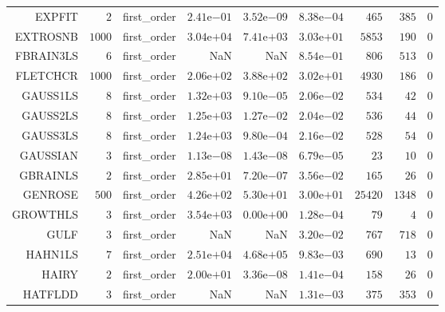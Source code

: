 \begin{longtable}{rrrrrrrrr}
EXPFIT & \(     2\) & first\_order & \( 2.41\)e\(-01\) & \( 3.52\)e\(-09\) & \( 8.38\)e\(-04\) & \(   465\) & \(   385\) & \(     0\) \\
EXTROSNB & \(  1000\) & first\_order & \( 3.04\)e\(+04\) & \( 7.41\)e\(+03\) & \( 3.03\)e\(+01\) & \(  5853\) & \(   190\) & \(     0\) \\
FBRAIN3LS & \(     6\) & first\_order &       NaN &       NaN & \( 8.54\)e\(-01\) & \(   806\) & \(   513\) & \(     0\) \\
FLETCHCR & \(  1000\) & first\_order & \( 2.06\)e\(+02\) & \( 3.88\)e\(+02\) & \( 3.02\)e\(+01\) & \(  4930\) & \(   186\) & \(     0\) \\
GAUSS1LS & \(     8\) & first\_order & \( 1.32\)e\(+03\) & \( 9.10\)e\(-05\) & \( 2.06\)e\(-02\) & \(   534\) & \(    42\) & \(     0\) \\
GAUSS2LS & \(     8\) & first\_order & \( 1.25\)e\(+03\) & \( 1.27\)e\(-02\) & \( 2.04\)e\(-02\) & \(   536\) & \(    44\) & \(     0\) \\
GAUSS3LS & \(     8\) & first\_order & \( 1.24\)e\(+03\) & \( 9.80\)e\(-04\) & \( 2.16\)e\(-02\) & \(   528\) & \(    54\) & \(     0\) \\
GAUSSIAN & \(     3\) & first\_order & \( 1.13\)e\(-08\) & \( 1.43\)e\(-08\) & \( 6.79\)e\(-05\) & \(    23\) & \(    10\) & \(     0\) \\
GBRAINLS & \(     2\) & first\_order & \( 2.85\)e\(+01\) & \( 7.20\)e\(-07\) & \( 3.56\)e\(-02\) & \(   165\) & \(    26\) & \(     0\) \\
GENROSE & \(   500\) & first\_order & \( 4.26\)e\(+02\) & \( 5.30\)e\(+01\) & \( 3.00\)e\(+01\) & \( 25420\) & \(  1348\) & \(     0\) \\
GROWTHLS & \(     3\) & first\_order & \( 3.54\)e\(+03\) & \( 0.00\)e\(+00\) & \( 1.28\)e\(-04\) & \(    79\) & \(     4\) & \(     0\) \\
GULF & \(     3\) & first\_order &       NaN &       NaN & \( 3.20\)e\(-02\) & \(   767\) & \(   718\) & \(     0\) \\
HAHN1LS & \(     7\) & first\_order & \( 2.51\)e\(+04\) & \( 4.68\)e\(+05\) & \( 9.83\)e\(-03\) & \(   690\) & \(    13\) & \(     0\) \\
HAIRY & \(     2\) & first\_order & \( 2.00\)e\(+01\) & \( 3.36\)e\(-08\) & \( 1.41\)e\(-04\) & \(   158\) & \(    26\) & \(     0\) \\
HATFLDD & \(     3\) & first\_order &       NaN &       NaN & \( 1.31\)e\(-03\) & \(   375\) & \(   353\) & \(     0\) \\

\end{longtable}
